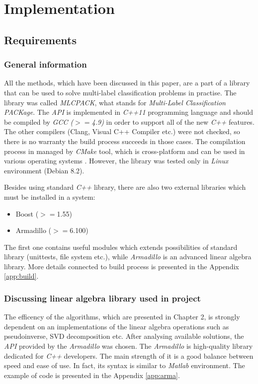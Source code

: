 \chapter{Implementation}

\section{Requirements}

\subsection{General information}
All the methods, which have been discussed in this paper, are a part of a library that can be used to solve multi-label classification problems in practise. The library was called \textit{MLCPACK}, what stands for \textit{Multi-Label Classification PACKage}. The \textit{API} is implemented in \textit{C++11} programming language and should be compiled by \textit{GCC ($>=$4.9)} in order to support all of the new \textit{C++} features. The other compilers (Clang, Visual C++ Compiler etc.) were not checked, so there is no warranty the build process succeeds in those cases.  The compilation process in managed by \textit{CMake} tool, which is cross-platform and can be used in various operating systems \cite{CMake}. However, the library was tested only in \textit{Linux} environment (Debian 8.2). 

Besides using standard \textit{C++} library, there are also two external libraries which must be installed in a system: 

\begin{itemize}
    \item Boost ($>=$1.55)
    \item Armadillo ($>=$6.100)
\end{itemize}
The first one contains useful modules which extends possibilities of standard library (unittests, file system etc.), while \textit{Armadillo} is an advanced linear algebra library. More details connected to build process is presented in the Appendix \ref{app:build}. 


\subsection{Discussing linear algebra library used in project}

The efficency of the algorithms, which are presented in Chapter 2, is strongly dependent on an implementations of the linear algebra operations such as pseudoinverse, SVD decomposition etc. After analysing available solutions, the \textit{API} provided by the \textit{Armadillo} was chosen. The \textit{Armadillo} is high-quality library dedicated for \textit{C++} developers. The main strength of it is a good balance between speed and ease of use. In fact, its syntax is similar to \textit{Matlab} environment. The example of code is presented in the Appendix \ref{app:arma}.

